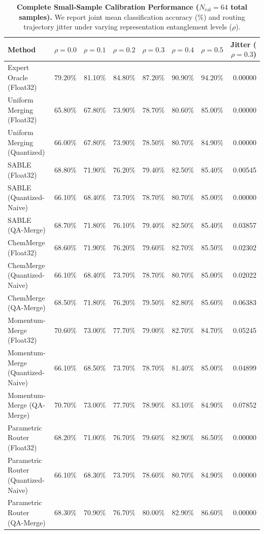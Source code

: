 \documentclass{article}
\theoremstyle{plain}
\theoremstyle{definition}
\theoremstyle{remark}
\begin{document}
\begin{table}[t]
\caption{\textbf{Complete Small-Sample Calibration Performance ($N_{\text{cal}} = 64$ total samples).} We report joint mean classification accuracy (\%) and routing trajectory jitter under varying representation entanglement levels ($\rho$).}
\label{tab:small_sample_full}
\vskip 0.1in
\begin{center}
\begin{small}
\begin{sc}
\begin{tabular}{lccccccr}
\toprule
Method & $\rho = 0.0$ & $\rho = 0.1$ & $\rho = 0.2$ & $\rho = 0.3$ & $\rho = 0.4$ & $\rho = 0.5$ & Jitter ($\rho=0.3$) \\
\midrule
Expert Oracle (Float32) & 79.20\% & 81.10\% & 84.80\% & 87.20\% & 90.90\% & 94.20\% & 0.00000 \\
\midrule
Uniform Merging (Float32) & 65.80\% & 67.80\% & 73.90\% & 78.70\% & 80.60\% & 85.00\% & 0.00000 \\
Uniform Merging (Quantized) & 66.00\% & 67.80\% & 73.90\% & 78.50\% & 80.70\% & 84.90\% & 0.00000 \\
\midrule
SABLE (Float32) & 68.80\% & 71.90\% & 76.20\% & 79.40\% & 82.50\% & 85.40\% & 0.00545 \\
SABLE (Quantized-Naive) & 66.10\% & 68.40\% & 73.70\% & 78.70\% & 80.70\% & 85.00\% & 0.00000 \\
SABLE (QA-Merge) & 68.70\% & 71.80\% & 76.10\% & 79.40\% & 82.50\% & 85.40\% & 0.03857 \\
\midrule
ChemMerge (Float32) & 68.60\% & 71.90\% & 76.20\% & 79.60\% & 82.70\% & 85.50\% & 0.02302 \\
ChemMerge (Quantized-Naive) & 66.10\% & 68.40\% & 73.70\% & 78.70\% & 80.70\% & 85.00\% & 0.02022 \\
ChemMerge (QA-Merge) & 68.50\% & 71.80\% & 76.20\% & 79.50\% & 82.80\% & 85.60\% & 0.06383 \\
\midrule
Momentum-Merge (Float32) & 70.60\% & 73.00\% & 77.70\% & 79.00\% & 82.70\% & 84.70\% & 0.05245 \\
Momentum-Merge (Quantized-Naive) & 66.10\% & 68.50\% & 73.70\% & 78.70\% & 81.40\% & 85.00\% & 0.04899 \\
Momentum-Merge (QA-Merge) & 70.70\% & 73.00\% & 77.70\% & 78.90\% & 83.10\% & 84.90\% & 0.07852 \\
\midrule
Parametric Router (Float32) & 68.20\% & 71.00\% & 76.70\% & 79.60\% & 82.90\% & 86.50\% & 0.00000 \\
Parametric Router (Quantized-Naive) & 66.10\% & 68.30\% & 73.70\% & 78.60\% & 80.70\% & 84.90\% & 0.00000 \\
Parametric Router (QA-Merge) & 68.30\% & 70.90\% & 76.70\% & 80.00\% & 82.90\% & 86.60\% & 0.00000 \\
\bottomrule
\end{tabular}
\end{sc}
\end{small}
\end{center}
\vskip -0.1in
\end{table}
\end{document}
